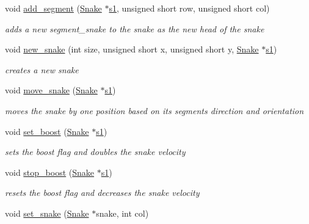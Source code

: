 \begin{DoxyCompactItemize}
\item 
void \hyperlink{group__snake_ga9905deea86c0d94567ede79df04a2917}{add\+\_\+segment} (\hyperlink{structSnake}{Snake} $\ast$\hyperlink{group__man__events_gaf79c0d77b0cca9ebf96bbbed1f88aed0}{s1}, unsigned short row, unsigned short col)
\begin{DoxyCompactList}\small\item\em adds a new segment\+\_\+snake to the snake as the new head of the snake \end{DoxyCompactList}\item 
void \hyperlink{group__snake_ga0da33cffbcc02a3da21cb4b74271c429}{new\+\_\+snake} (int size, unsigned short x, unsigned short y, \hyperlink{structSnake}{Snake} $\ast$\hyperlink{group__man__events_gaf79c0d77b0cca9ebf96bbbed1f88aed0}{s1})
\begin{DoxyCompactList}\small\item\em creates a new snake \end{DoxyCompactList}\item 
void \hyperlink{group__snake_ga0ff179758d3dbd6aa7c79dc51776c9d7}{move\+\_\+snake} (\hyperlink{structSnake}{Snake} $\ast$\hyperlink{group__man__events_gaf79c0d77b0cca9ebf96bbbed1f88aed0}{s1})
\begin{DoxyCompactList}\small\item\em moves the snake by one position based on its segments direction and orientation \end{DoxyCompactList}\item 
void \hyperlink{group__snake_gabc6924be4961d75d44ed29f0a4ed5bbb}{set\+\_\+boost} (\hyperlink{structSnake}{Snake} $\ast$\hyperlink{group__man__events_gaf79c0d77b0cca9ebf96bbbed1f88aed0}{s1})
\begin{DoxyCompactList}\small\item\em sets the boost flag and doubles the snake velocity \end{DoxyCompactList}\item 
void \hyperlink{group__snake_ga471508bb9844c474f3c27e078aecc638}{stop\+\_\+boost} (\hyperlink{structSnake}{Snake} $\ast$\hyperlink{group__man__events_gaf79c0d77b0cca9ebf96bbbed1f88aed0}{s1})
\begin{DoxyCompactList}\small\item\em resets the boost flag and decreases the snake velocity \end{DoxyCompactList}\item 
void \hyperlink{group__snake_gafc851c81ca29b4d1e7e8890e7bf6bbf0}{set\+\_\+snake} (\hyperlink{structSnake}{Snake} $\ast$snake, int col)

\end{DoxyCompactItemize}
